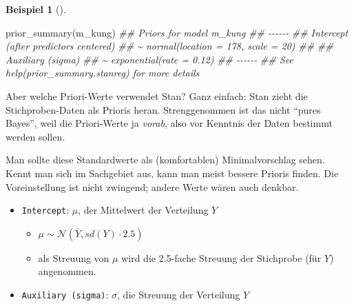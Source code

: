 \documentclass[
  ngerman,
  letterpaper,
  twoside,
  open=any]{scrbook}
\newenvironment{Shaded}{\begin{snugshade}}{\end{snugshade}}
\newcommand{\DocumentationTok}[1]{\textcolor[rgb]{0.37,0.37,0.37}{\textit{#1}}}
\newcommand{\FunctionTok}[1]{\textcolor[rgb]{0.28,0.35,0.67}{#1}}
\newcommand{\NormalTok}[1]{\textcolor[rgb]{0.00,0.23,0.31}{#1}}
\providecommand{\tightlist}{%
  \setlength{\itemsep}{0pt}\setlength{\parskip}{0pt}}\usepackage{longtable,booktabs,array}
\theoremstyle{definition}
\newtheorem{example}{Beispiel}[chapter]
\theoremstyle{plain}
\theoremstyle{definition}
\theoremstyle{definition}
\theoremstyle{remark}
\begin{document}
\begin{example}[]
\begin{Shaded}
\begin{Highlighting}[]
\FunctionTok{prior\_summary}\NormalTok{(m\_kung)}
\DocumentationTok{\#\# Priors for model \textquotesingle{}m\_kung\textquotesingle{} }
\DocumentationTok{\#\# {-}{-}{-}{-}{-}{-}}
\DocumentationTok{\#\# Intercept (after predictors centered)}
\DocumentationTok{\#\#  \textasciitilde{} normal(location = 178, scale = 20)}
\DocumentationTok{\#\# }
\DocumentationTok{\#\# Auxiliary (sigma)}
\DocumentationTok{\#\#  \textasciitilde{} exponential(rate = 0.12)}
\DocumentationTok{\#\# {-}{-}{-}{-}{-}{-}}
\DocumentationTok{\#\# See help(\textquotesingle{}prior\_summary.stanreg\textquotesingle{}) for more details}
\end{Highlighting}
\end{Shaded}

Aber welche Priori-Werte verwendet Stan? Ganz einfach: Stan zieht die
Stichproben-Daten als Prioris heran. Strenggenommen ist das nicht
\enquote{pures Bayes}, weil die Priori-Werte ja \emph{vorab}, also vor
Kenntnis der Daten bestimmt werden sollen.

Man sollte diese Standardwerte als (komfortablen) Minimalvorschlag
sehen. Kennt man sich im Sachgebiet aus, kann man meist bessere Prioris
finden. Die Voreinstellung ist nicht zwingend; andere Werte wären auch
denkbar.

\begin{tcolorbox}[enhanced jigsaw, arc=.35mm, bottomrule=.15mm, bottomtitle=1mm, breakable, colback=white, colbacktitle=quarto-callout-note-color!10!white, colframe=quarto-callout-note-color-frame, coltitle=black, left=2mm, leftrule=.75mm, opacityback=0, opacitybacktitle=0.6, rightrule=.15mm, title=\textcolor{quarto-callout-note-color}{\faInfo}\hspace{0.5em}{Standardwerte von \texttt{stan\_glm}}, titlerule=0mm, toprule=.15mm, toptitle=1mm]

\begin{itemize}
\tightlist
\item
  \texttt{Intercept}: \(\mu\), der Mittelwert der Verteilung \(Y\)

  \begin{itemize}
  \tightlist
  \item
    \(\mu \sim \mathcal{N}(\bar{Y}, sd(Y)\cdot 2.5)\)
  \item
    als Streuung von \(\mu\) wird die 2.5-fache Streuung der Stichprobe
    (für \(Y\)) angenommen.
  \end{itemize}
\item
  \texttt{Auxiliary\ (sigma)}: \(\sigma\), die Streuung der Verteilung
  \(Y\)


\end{itemize}
\end{tcolorbox}
\end{example}
\end{document}
